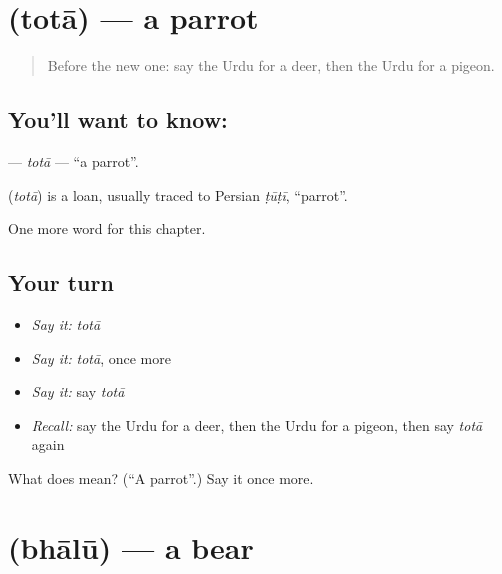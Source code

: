 \section[\texorpdfstring{\ur{طوطا} (totā)}{طوطا (totā)}]{ (totā) — a parrot}

\label{lesson:UR-C128-tota}



\begin{quote}
Before the new one: say the Urdu for a deer, then the Urdu for a pigeon.
\end{quote}

\subsection*{You'll want to know: }
\textbf{} — \emph{totā} — \textquotedblleft{}a parrot\textquotedblright{}.

\begin{cousinweb}
\textbf{} (\emph{totā}) is a loan, usually traced to Persian \emph{ṭūṭī}, \textquotedblleft{}parrot\textquotedblright{}.
\end{cousinweb}

\begin{grammarlens}[title={What you've built}]
One more word for this chapter.
\end{grammarlens}

\subsection*{Your turn}
\begin{itemize}
\raggedright
  \item \emph{Say it:} \emph{totā}
  \item \emph{Say it:} \emph{totā}, once more
  \item \emph{Say it:} say \emph{totā}
  \item \emph{Recall:} say the Urdu for a deer, then the Urdu for a pigeon, then say \emph{totā} again
\end{itemize}

\begin{tcolorbox}[breakable,colback=teal!4,colframe=teal!35!black,title={Before you move on}]
What does  mean? (\textquotedblleft{}A parrot\textquotedblright{}.) Say it once more.
\end{tcolorbox}
\section[\texorpdfstring{\ur{بھالو} (bhālū)}{بھالو (bhālū)}]{ (bhālū) — a bear}

